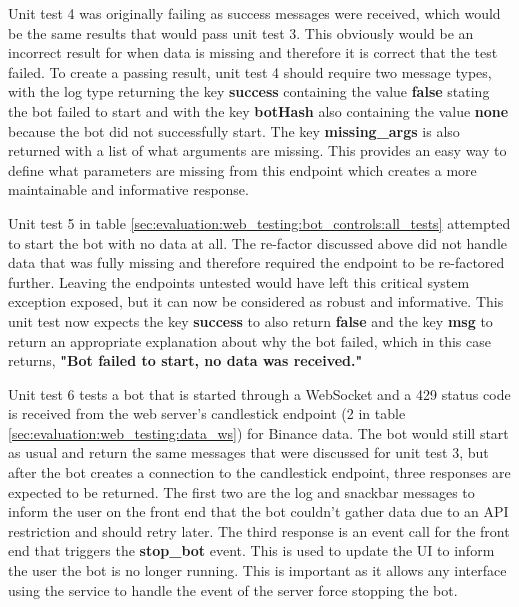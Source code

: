 Unit test 4 was originally failing as success messages were received, which would be the same results that would pass unit test 3. This obviously would be an incorrect result for when data is missing and therefore it is correct that the test failed. To create a passing result, unit test 4 should require two message types, with the log type returning the key \textbf{success} containing the value \textbf{false} stating the bot failed to start and with the key \textbf{botHash} also containing the value \textbf{none} because the bot did not successfully start. The key \textbf{missing\_args} is also returned with a list of what arguments are missing. This provides an easy way to define what parameters are missing from this endpoint which creates a more maintainable and informative response. 

Unit test 5 in table \ref{sec:evaluation:web_testing:bot_controls:all_tests} attempted to start the bot with no data at all. The re-factor discussed above did not handle data that was fully missing and therefore required the endpoint to be re-factored further. Leaving the endpoints untested would have left this critical system exception exposed, but it can now be considered as robust and informative. This unit test now expects the key \textbf{success} to also return \textbf{false} and the key \textbf{msg} to return an appropriate explanation about why the bot failed, which in this case returns, \textbf{"Bot failed to start, no data was received."}

Unit test 6 tests a bot that is started through a WebSocket and a 429 status code is received from the web server's candlestick endpoint (2 in table \ref{sec:evaluation:web_testing:data_ws}) for Binance data. The bot would still start as usual and return the same messages that were discussed for unit test 3, but after the bot creates a connection to the candlestick endpoint, three responses are expected to be returned. The first two are the log and snackbar messages to inform the user on the front end that the bot couldn't gather data due to an API restriction and should retry later. The third response is an event call for the front end that triggers the \textbf{stop\_bot} event. This is used to update the UI to inform the user the bot is no longer running. This is important as it allows any interface using the service to handle the event of the server force stopping the bot.

